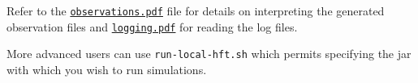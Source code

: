 \documentclass[11pt]{article}
\begin{document}
Refer to the \href{observations.pdf}{\texttt{observations.pdf}} file for details on interpreting the generated observation files and \href{logging.pdf}{\texttt{logging.pdf}} for reading the log files.

More advanced users can use \verb|run-local-hft.sh| which permits specifying the jar with which you wish to run simulations.
\end{document}
